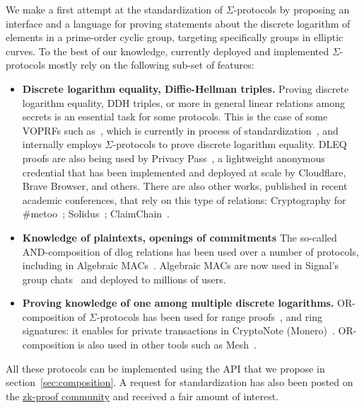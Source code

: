 \documentclass[runningheads]{llncs}
\begin{document}
We make a first attempt at the standardization of $\Sigma$-protocols by proposing an interface and a language for proving statements about the discrete logarithm of elements in a prime-order cyclic group, targeting specifically groups in elliptic curves. To the best of our knowledge, currently deployed and implemented $\Sigma$-protocols mostly rely on the following sub-set of features:

\begin{itemize}
  \item \textbf{Discrete logarithm equality, Diffie-Hellman triples.}
  Proving discrete logarithm equality, DDH triples, or more in general linear relations among secrets is an essential task for some protocols. This is the case of some VOPRFs such as~\cite{AC:JarKiaKra14},
  which is currently in process of standardization~\cite{cfrg-voprf}, and internally employs $\Sigma$-protocols to prove discrete logarithm equality.
  DLEQ proofs are also being used by Privacy Pass~\cite{PoPETS:DGSTV18}, a lightweight anonymous credential that has been implemented and deployed at scale by Cloudflare, Brave
  Browser, and others.
  There are also other works, published in recent academic conferences, that rely on this type of relations: Cryptography for \#metoo~\cite{PoPETS:KuyKraRab19}; Solidus~\cite{CCS:CZJKJS17}; ClaimChain~\cite{ClaimChain}.
  \item \textbf{Knowledge of plaintexts, openings of commitments}
  The so-called AND-composition of dlog relations has been used over a number of protocols,
  including in Algebraic MACs~\cite{CCS:ChaMeiZav14}.
  Algebraic MACs are now used in Signal's group chats~\cite{CCS:ChaPerZav20} and deployed to millions of users.
  \item \textbf{Proving knowledge of one among multiple discrete logarithms.}
  OR-composition of $\Sigma$-protocols
  has been used for range proofs~\cite{borromeansig}, and ring signatures: it enables for private transactions in CryptoNote (Monero)~\cite{monero}.
  OR-composition is also used in other tools such as Mesh~\cite{PoPETS:AlTGon19}.
\end{itemize}


All these protocols can be implemented using the API that we propose in section~\cref{sec:composition}.
A request for standardization has also been posted on the \href{https://community.zkproof.org/t/standardizing-sigma-protocols/471/}{zk-proof community} and received a fair amount of interest.
\end{document}
